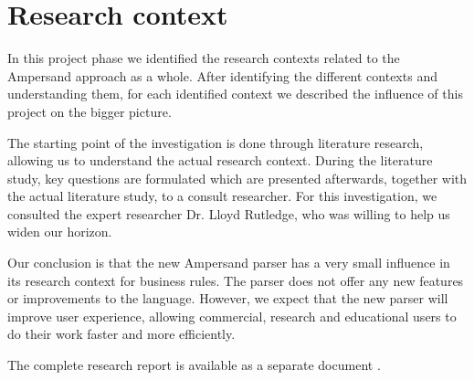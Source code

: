 
\section{Research context}
\label{sec:research-context}

In this project phase we identified the research contexts related to the Ampersand approach as a whole.
After identifying the different contexts and understanding them, for each identified context we described the influence of this project on the bigger picture.

The starting point of the investigation is done through literature research, allowing us to understand the actual research context.
During the literature study, key questions are formulated which are presented afterwards, together with the actual literature study, to a consult researcher.
For this investigation, we consulted the expert researcher Dr. Lloyd Rutledge, who was willing to help us widen our horizon.

Our conclusion is that the new Ampersand parser has a very small influence in its research context for business rules.
The parser does not offer any new features or improvements to the language.
However, we expect that the new parser will improve user experience, allowing commercial, research and educational users to do their work faster and more efficiently.

The complete research report is available as a separate document .
